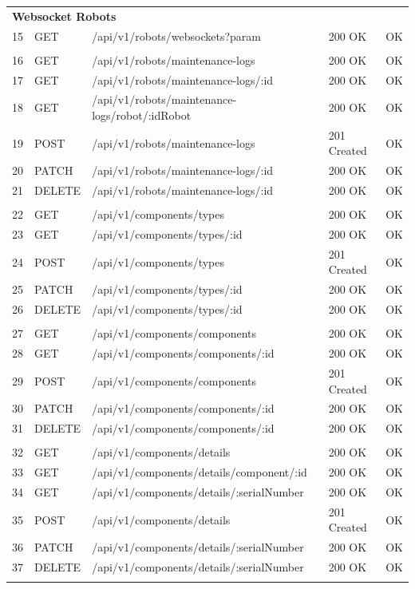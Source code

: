 \begin{longtable}{p{0.7cm} p{1.4cm} p{7cm} p{2.2cm} p{1.2cm}}
\multicolumn{5}{l}{\textbf{Websocket Robots}}\\
15 & GET & /api/v1/robots/websockets?param & 200 OK & OK \\
\addlinespace

\multicolumn{5}{l}{\textbf{Robot Maintenance Logs}}\\
16 & GET & /api/v1/robots/maintenance-logs & 200 OK & OK \\
17 & GET & /api/v1/robots/maintenance-logs/:id & 200 OK & OK \\
18 & GET & /api/v1/robots/maintenance-logs/robot/:idRobot & 200 OK & OK \\
19 & POST & /api/v1/robots/maintenance-logs & 201 Created & OK \\
20 & PATCH & /api/v1/robots/maintenance-logs/:id & 200 OK & OK \\
21 & DELETE & /api/v1/robots/maintenance-logs/:id & 200 OK & OK \\
\addlinespace

\multicolumn{5}{l}{\textbf{Component Types}}\\
22 & GET & /api/v1/components/types & 200 OK & OK \\
23 & GET & /api/v1/components/types/:id & 200 OK & OK \\
24 & POST & /api/v1/components/types & 201 Created & OK \\
25 & PATCH & /api/v1/components/types/:id & 200 OK & OK \\
26 & DELETE & /api/v1/components/types/:id & 200 OK & OK \\
\addlinespace

\multicolumn{5}{l}{\textbf{Components}}\\
27 & GET & /api/v1/components/components & 200 OK & OK \\
28 & GET & /api/v1/components/components/:id & 200 OK & OK \\
29 & POST & /api/v1/components/components & 201 Created & OK \\
30 & PATCH & /api/v1/components/components/:id & 200 OK & OK \\
31 & DELETE & /api/v1/components/components/:id & 200 OK & OK \\
\addlinespace

\multicolumn{5}{l}{\textbf{Component Details}}\\
32 & GET & /api/v1/components/details & 200 OK & OK \\
33 & GET & /api/v1/components/details/component/:id & 200 OK & OK \\
34 & GET & /api/v1/components/details/:serialNumber & 200 OK & OK \\
35 & POST & /api/v1/components/details & 201 Created & OK \\
36 & PATCH & /api/v1/components/details/:serialNumber & 200 OK & OK \\
37 & DELETE & /api/v1/components/details/:serialNumber & 200 OK & OK \\
\addlinespace


\end{longtable}
